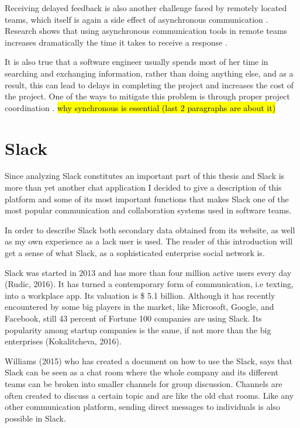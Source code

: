 Receiving delayed feedback is also another challenge faced by remotely located teams, which itself is again a side effect of asynchronous communication \citep{conchuir2006exploring,holmstrom2006agile}. Research shows that using asynchronous communication tools in remote teams increases dramatically the time it takes to receive a response \citep{holmstrom2006global}. 

It is also true that a software engineer usually spends most of her time in searching and exchanging information, rather than doing anything else, and as a result, this can lead to delays in completing the project and increases the cost of the project. One of the ways to mitigate this problem is through proper project coordination \citep{dumitriu2006issues}. \hl{why synchronous is essential (last 2 paragraphs are about it)}

\section{Slack}
Since analyzing Slack constitutes an important part of this thesis and Slack is more than yet another chat application I decided to give a description of this platform and some of its most important functions that makes Slack one of the most popular communication and collaboration systems used in software teams.

In order to describe Slack both secondary data obtained from its website, as well as my own experience as a lack user is used. The reader of this introduction will get a sense of what Slack, as a sophisticated enterprise social network is.

Slack was started in 2013 and has more than four million active users every day (Rudic, 2016). It has turned a contemporary form of communication, i.e texting, into a workplace app. Its valuation is \$ 5.1 billion. Although it has recently encountered by some big players in the market, like Microsoft, Google, and Facebook, still 43 percent of Fortune 100 companies are using Slack. Its popularity among startup companies is the same, if not more than the big enterprises (Kokalitcheva, 2016).

Williams (2015) who has created a document on how to use the Slack, says that Slack can be seen as a chat room where the whole company and its different teams can be broken into smaller channels for group discussion. Channels are often created to discuss a certain topic and are like the old chat rooms. Like any other communication platform, sending direct messages to individuals is also possible in Slack.